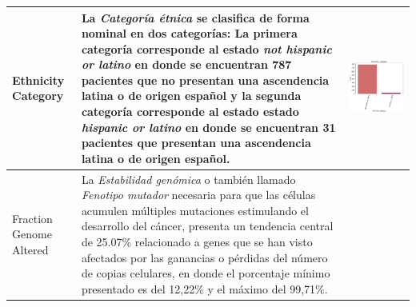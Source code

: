 \begin{table}[!htb]
\begin{threeparttable}
\begin{tabular}{p{2.5cm} p{7cm} p{6.5cm}}
			Ethnicity Category
			&La \textit{Categoría étnica} se clasifica de forma nominal en dos categorías: La primera categoría corresponde al estado \textit{not hispanic or latino} en donde se encuentran 787 pacientes que no presentan una ascendencia latina o de origen español y la segunda categoría corresponde al estado estado \textit{hispanic or latino} en donde se encuentran 31 pacientes que presentan una ascendencia latina o de origen español.
			& \begin{center}\includegraphics[width=1\linewidth]{NOTEBOOK/IMAGENES_DESCRIPTIVAS/13_ethnicity_category}\end{center}
			\\ \hline
			
			Fraction Genome Altered
			& La \textit{Estabilidad genómica} o también llamado \textit{Fenotipo mutador} necesaria para que las células acumulen múltiples mutaciones estimulando el desarrollo del cáncer, presenta un tendencia central de 25.07\% relacionado a genes que se han visto afectados por las ganancias o pérdidas del número de copias celulares, en donde el porcentaje mínimo presentado es del 12,22\% y el máximo del 99,71\%.
			

\end{tabular}
\end{threeparttable}
\end{table}
